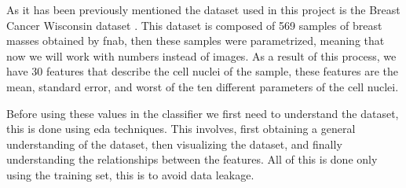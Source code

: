 As it has been previously mentioned the dataset used in this project is the Breast Cancer Wisconsin dataset \cite{william_wolberg_breast_1993}. This dataset is composed of 569 samples of breast masses obtained by \ac{fnab}, then these samples were parametrized, meaning that now we will work with numbers instead of images. As a result of this process, we have 30 features that describe the cell nuclei of the sample, these features are the mean, standard error, and worst of the ten different parameters of the cell nuclei.

Before using these values in the classifier we first need to understand the dataset, this is done using \ac{eda} techniques. This involves, first obtaining a general understanding of the dataset, then visualizing the dataset, and finally understanding the relationships between the features. All of this is done only using the training set, this is to avoid data leakage.

